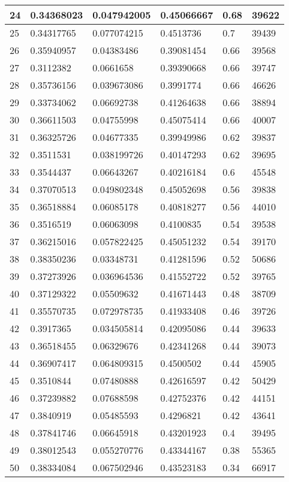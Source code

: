 \begin{longtable}{|l|l|l|l|l|l|}
24 & 0.34368023 & 0.047942005 & 0.45066667 & 0.68 & 39622 \\ \hline 
25 & 0.34317765 & 0.077074215 & 0.4513736 & 0.7 & 39439 \\ \hline 
26 & 0.35940957 & 0.04383486 & 0.39081454 & 0.66 & 39568 \\ \hline 
27 & 0.3112382 & 0.0661658 & 0.39390668 & 0.66 & 39747 \\ \hline 
28 & 0.35736156 & 0.039673086 & 0.3991774 & 0.66 & 46626 \\ \hline 
29 & 0.33734062 & 0.06692738 & 0.41264638 & 0.66 & 38894 \\ \hline 
30 & 0.36611503 & 0.04755998 & 0.45075414 & 0.66 & 40007 \\ \hline 
31 & 0.36325726 & 0.04677335 & 0.39949986 & 0.62 & 39837 \\ \hline 
32 & 0.3511531 & 0.038199726 & 0.40147293 & 0.62 & 39695 \\ \hline 
33 & 0.3544437 & 0.06643267 & 0.40216184 & 0.6 & 45548 \\ \hline 
34 & 0.37070513 & 0.049802348 & 0.45052698 & 0.56 & 39838 \\ \hline 
35 & 0.36518884 & 0.06085178 & 0.40818277 & 0.56 & 44010 \\ \hline 
36 & 0.3516519 & 0.06063098 & 0.4100835 & 0.54 & 39538 \\ \hline 
37 & 0.36215016 & 0.057822425 & 0.45051232 & 0.54 & 39170 \\ \hline 
38 & 0.38350236 & 0.03348731 & 0.41281596 & 0.52 & 50686 \\ \hline 
39 & 0.37273926 & 0.036964536 & 0.41552722 & 0.52 & 39765 \\ \hline 
40 & 0.37129322 & 0.05509632 & 0.41671443 & 0.48 & 38709 \\ \hline 
41 & 0.35570735 & 0.072978735 & 0.41933408 & 0.46 & 39726 \\ \hline 
42 & 0.3917365 & 0.034505814 & 0.42095086 & 0.44 & 39633 \\ \hline 
43 & 0.36518455 & 0.06329676 & 0.42341268 & 0.44 & 39073 \\ \hline 
44 & 0.36907417 & 0.064809315 & 0.4500502 & 0.44 & 45905 \\ \hline 
45 & 0.3510844 & 0.07480888 & 0.42616597 & 0.42 & 50429 \\ \hline 
46 & 0.37239882 & 0.07688598 & 0.42752376 & 0.42 & 44151 \\ \hline 
47 & 0.3840919 & 0.05485593 & 0.4296821 & 0.42 & 43641 \\ \hline 
48 & 0.37841746 & 0.06645918 & 0.43201923 & 0.4 & 39495 \\ \hline 
49 & 0.38012543 & 0.055270776 & 0.43344167 & 0.38 & 55365 \\ \hline 
50 & 0.38334084 & 0.067502946 & 0.43523183 & 0.34 & 66917 \\ \hline 
\end{longtable}